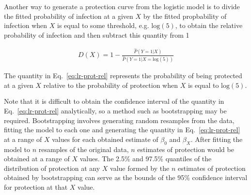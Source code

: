 Another way to generate a protection curve from the logistic model is to divide the fitted probability of infection at a given $X$ by the fitted propbability of infection when $X$ is equal to some threshold, e.g. $\text{log}(5)$, to obtain the relative probability of infection and then subtract this quantity from 1

\begin{gather}
    D(X) = 1 - \frac{\hat{P}(Y=1 | X)}{\hat{P}(Y=1 | X = \text{log}(5))}
    \label{eq:lr-prot-rel}
\end{gather}

The quantity in Eq.~\ref{eq:lr-prot-rel} represents the probability of being protected at a given $X$ relative to the probability of protection when $X$ is equal to $\text{log}(5)$.

Note that it is difficult to obtain the confidence interval of the quantity in Eq.~\ref{eq:lr-prot-rel} analytically, so a method such as bootstrapping may be required.
Bootstrapping involves generating random resamples from the data, fitting the model to each one and generating the quantity in Eq.~\ref{eq:lr-prot-rel} at a range of $X$ values for each obtained estimate of $\beta_0$ and $\beta_X$.
After fitting the model to $n$ resamples of the original data, $n$ estimates of protection would be obtained at a range of $X$ values.
The 2.5\% and 97.5\% quantiles of the distribution of protection at any $X$ value formed by the $n$ estimates of protection obtained by bootstrapping can serve as the bounds of the 95\% confidence interval for protection at that $X$ value.

